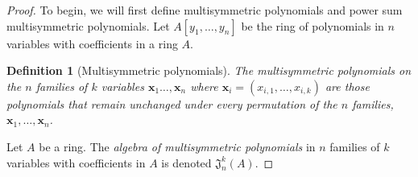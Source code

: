 \documentclass[12pt]{article}
\newtheorem{definition}[theorem]{Definition}
\begin{document}
\begin{proof} 
To begin, we will first define multisymmetric polynomials and power sum multisymmetric polynomials. Let $A[y_1, \dots, y_n]$ be the ring of polynomials in $n$ variables with coefficients in a ring $A$.

    \begin{definition}[Multisymmetric polynomials]
        The multisymmetric polynomials on the $n$ families of $k$ variables $\mathbf{x}_1 \dots, \mathbf{x}_n$ where $\mathbf{x}_i = (x_{i, 1}, \dots, x_{i, k})$ are those polynomials that remain unchanged under every permutation of the $n$ families, $\mathbf{x}_1, \dots, \mathbf{x}_n$.
    \end{definition}
    Let $A$ be a ring. The \textit{algebra of multisymmetric polynomials} in $n$ families of $k$ variables with coefficients in $A$ is denoted $\mathfrak{J}_n^k(A)$. 


\end{proof}
\end{document}
